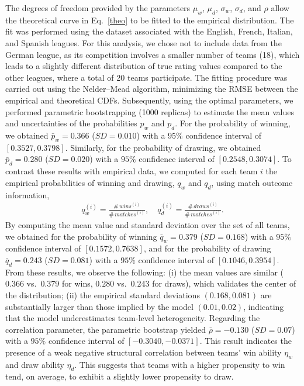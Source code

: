 \documentclass[preprint, amsmath,amssymb, pre]{revtex4-2}
\begin{document}
The degrees of freedom provided by the parameters $\mu_w$, $\mu_d$, $\sigma_w$, $\sigma_d$, and $\rho$ allow the theoretical curve in Eq.~\ref{theo} to be fitted to the empirical distribution.
%
The fit was performed using the dataset associated with the English, French, Italian, and Spanish leagues. For this analysis, we chose not to include data from the German league, as its competition involves a smaller number of teams (18), which leads to a slightly different distribution of true rating values compared to the other leagues, where a total of 20 teams participate.
%
The fitting procedure was carried out using the Nelder--Mead algorithm, minimizing the RMSE between the empirical and theoretical CDFs.
%
Subsequently, using the optimal parameters, we performed parametric bootstrapping (1000 replicas) to estimate the mean values and uncertainties of the probabilities $p_w$ and $p_d$.
%
For the probability of winning, we obtained $\bar{p}_w = 0.366$ ($SD = 0.010$) with a $95\%$ confidence interval of $[0.3527, 0.3798]$.
Similarly, for the probability of drawing, we obtained $\bar{p}_d = 0.280$ ($SD = 0.020$) with a $95\%$ confidence interval of $[0.2548, 0.3074]$.
%
To contrast these results with empirical data, we computed for each team $i$ the empirical probabilities of winning and drawing, $q_w$ and $q_d$, using match outcome information,
%
\begin{align*}
q_w^{(i)} = \frac{\#\,wins^{(i)}}{\#\,matches^{(i)}}, \quad
q_d^{(i)} = \frac{\#\,draws^{(i)}}{\#\,matches^{(i)}}.
\end{align*}
%
By computing the mean value and standard deviation over the set of all teams, we obtained for the probability of winning $\bar{q}_w = 0.379$ ($SD = 0.168$) with a $95\%$ confidence interval of $[0.1572, 0.7638]$, and for the probability of drawing $\bar{q}_d = 0.243$ ($SD = 0.081$) with a $95\%$ confidence interval of $[0.1046, 0.3954]$.
%
From these results, we observe the following: (i) the mean values are similar ($0.366$ vs.\ $0.379$ for wins, $0.280$ vs.\ $0.243$ for draws), which validates the center of the distribution; (ii) the empirical standard deviations $(0.168, 0.081)$ are substantially larger than those implied by the model $(0.01, 0.02)$, indicating that the model underestimates team-level heterogeneity.
%
Regarding the correlation parameter, the parametric bootstrap yielded $\bar{\rho} = -0.130$ ($SD = 0.07$) with a $95\%$ confidence interval of $[-0.3040, -0.0371]$. This result indicates the presence of a weak negative structural correlation between teams’ win ability $\eta_w$ and draw ability $\eta_d$. This suggests that teams with a higher propensity to win tend, on average, to exhibit a slightly lower propensity to draw.
\end{document}
